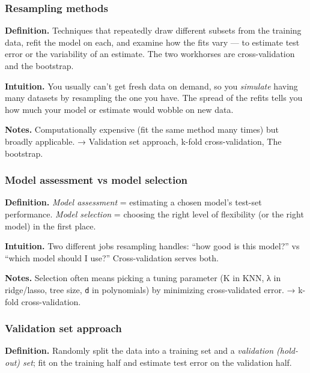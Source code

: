 \documentclass[
  10pt,
  letterpaper,
  onecolumn]{article}
\begin{document}
\hypertarget{resampling-methods}{%
\subsubsection{Resampling methods}\label{resampling-methods}}

\textbf{Definition.} Techniques that repeatedly draw different subsets
from the training data, refit the model on each, and examine how the
fits vary --- to estimate test error or the variability of an estimate.
The two workhorses are cross-validation and the bootstrap.

\textbf{Intuition.} You usually can't get fresh data on demand, so you
\emph{simulate} having many datasets by resampling the one you have. The
spread of the refits tells you how much your model or estimate would
wobble on new data.

\textbf{Notes.} Computationally expensive (fit the same method many
times) but broadly applicable. → Validation set approach, k-fold
cross-validation, The bootstrap.

\hypertarget{model-assessment-vs-model-selection}{%
\subsubsection{Model assessment vs model
selection}\label{model-assessment-vs-model-selection}}

\textbf{Definition.} \emph{Model assessment} = estimating a chosen
model's test-set performance. \emph{Model selection} = choosing the
right level of flexibility (or the right model) in the first place.

\textbf{Intuition.} Two different jobs resampling handles: ``how good is
this model?'' vs ``which model should I use?'' Cross-validation serves
both.

\textbf{Notes.} Selection often means picking a tuning parameter (K in
KNN, λ in ridge/lasso, tree size, \texttt{d} in polynomials) by
minimizing cross-validated error. → k-fold cross-validation.

\hypertarget{validation-set-approach}{%
\subsubsection{Validation set approach}\label{validation-set-approach}}

\textbf{Definition.} Randomly split the data into a training set and a
\emph{validation (hold-out) set}; fit on the training half and estimate
test error on the validation half.
\end{document}
